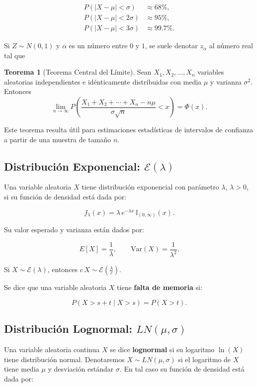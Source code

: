 \documentclass[11pt, a4paper]{article}
\theoremstyle{definition}
\newtheorem{theorem}{Teorema}
\begin{document}
\begin{align*}
P(|X-\mu|<\sigma) &\approx 68\%, \\
P(|X-\mu|<2\sigma) &\approx 95\%, \\
P(|X-\mu|<3\sigma) &\approx 99.7\%.
\end{align*}

Si $Z\sim N(0,1)$ y $\alpha$ es un número entre $0$ y $1$, se suele denotar $z_{\alpha}$ al número real tal que

\begin{theorem}[Teorema Central del Límite]
    Sean $X_1, X_2, \ldots, X_n$ variables aleatorias independientes e idénticamente distribuidas con media $\mu$ y varianza $\sigma^2$.
    Entonces
    \[
    \lim_{n \to \infty} P\left( \frac{X_1 + X_2 + \cdots + X_n - n\mu}{\sigma\sqrt{n}} < x \right) = \Phi(x).
    \]

    Este teorema resulta útil para estimaciones estadísticas de intervalos de confianza a partir de una muestra de tamaño $n$.
    

\end{theorem}


\subsection*{Distribución Exponencial: $\mathcal{E}(\lambda)$}
Una variable aleatoria $X$ tiene distribución exponencial con parámetro $\lambda$, $\lambda>0$, si su función de densidad está dada por:

\[f_{\lambda}(x)=\lambda\,e^{-\lambda x}\,\mathbb{I}_{(0,\infty)}(x).\]

Su valor esperado y varianza están dados por:

\[E[X]=\frac{1}{\lambda},\qquad \text{Var}(X)=\frac{1}{\lambda^{2}}.\]

Si $X\sim\mathcal{E}(\lambda)$, entonces $c\,X\sim\mathcal{E}\left(\frac{\lambda}{c}\right)$.

Se dice que una variable aleatoria $X$ tiene \textbf{falta de memoria} si:

\[P(X>s+t\mid X>s)=P(X>t).\]

\subsection*{Distribución Lognormal: $LN(\mu,\sigma)$}
Una variable aleatoria continua $X$ se dice \textbf{lognormal} si su logaritmo $\ln(X)$ tiene distribución normal. Denotaremos $X\sim LN(\mu,\sigma)$ si el logaritmo de $X$ tiene media $\mu$ y desviación estándar $\sigma$. En tal caso su función de densidad está dada por:
\end{document}
